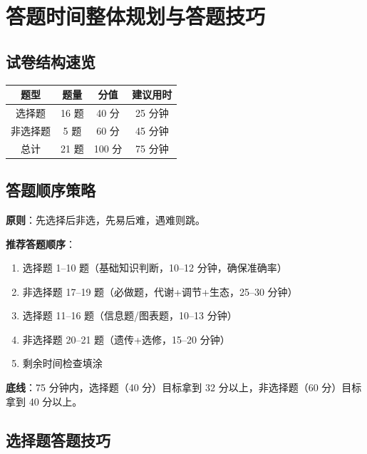 \section{答题时间整体规划与答题技巧}

\subsection{试卷结构速览}

\begin{center}
\begin{tabular}{c|c|c|c}
题型 & 题量 & 分值 & 建议用时 \\ \hline
选择题 & 16 题 & 40 分 & 25 分钟 \\
非选择题 & 5 题 & 60 分 & 45 分钟 \\
总计 & 21 题 & 100 分 & 75 分钟
\end{tabular}
\end{center}

\subsection{答题顺序策略}

\textbf{原则}：先选择后非选，先易后难，遇难则跳。

\textbf{推荐答题顺序}：
\begin{enumerate}
  \item 选择题 1--10 题（基础知识判断，10--12 分钟，确保准确率）
  \item 非选择题 17--19 题（必做题，代谢+调节+生态，25--30 分钟）
  \item 选择题 11--16 题（信息题/图表题，10--13 分钟）
  \item 非选择题 20--21 题（遗传+选修，15--20 分钟）
  \item 剩余时间检查填涂
\end{enumerate}

\textbf{底线}：75 分钟内，选择题（40 分）目标拿到 32 分以上，非选择题（60 分）目标拿到 40 分以上。

\subsection{选择题答题技巧}

